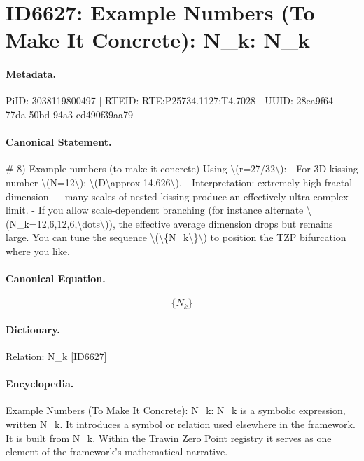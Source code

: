 \section*{ID6627: Example Numbers (To Make It Concrete): N\_k: N\_k}
\paragraph{Metadata.}
PiID: 3038119800497 | RTEID: RTE:P25734.1127:T4.7028 | UUID: 28ea9f64-77da-50bd-94a3-cd490f39aa79

\paragraph{Canonical Statement.}
\# 8) Example numbers (to make it concrete) Using \textbackslash{}(r=27/32\textbackslash{}): - For 3D kissing number \textbackslash{}(N=12\textbackslash{}): \textbackslash{}(D\textbackslash{}approx 14.626\textbackslash{}). - Interpretation: extremely high fractal dimension — many scales of nested kissing produce an effectively ultra-complex limit. - If you allow scale-dependent branching (for instance alternate \textbackslash{}(N\_k=12,6,12,6,\textbackslash{}dots\textbackslash{})), the effective average dimension drops but remains large. You can tune the sequence \textbackslash{}(\textbackslash{}\{N\_k\textbackslash{}\}\textbackslash{}) to position the TZP bifurcation where you like.

\paragraph{Canonical Equation.}
\[
\{N_k\}
\]

\paragraph{Dictionary.}
Relation: N\_k [ID6627]

\paragraph{Encyclopedia.}
Example Numbers (To Make It Concrete): N\_k: N\_k is a symbolic expression, written N\_k. It introduces a symbol or relation used elsewhere in the framework. It is built from N\_k. Within the Trawin Zero Point registry it serves as one element of the framework's mathematical narrative.
